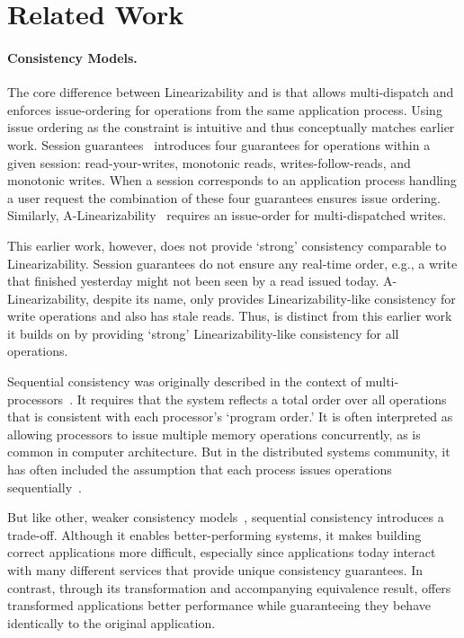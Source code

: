 \section{Related Work}
\label{sec:related}


\paragraph{Consistency Models.}
The core difference between Linearizability and \mdl{} is that \mdl{} allows multi-dispatch and enforces issue-ordering for operations from the same application process.
Using issue ordering as the constraint is intuitive and thus conceptually matches earlier work.
Session guarantees~\cite{terry1994session} introduces four guarantees for operations within a given session: read-your-writes, monotonic reads, writes-follow-reads, and monotonic writes. When a session corresponds to an application process handling a user request the combination of these four guarantees ensures issue ordering.
Similarly, A-Linearizability~\cite{hunt2010zookeeper} requires an issue-order for multi-dispatched writes.

This earlier work, however, does not provide `strong' consistency comparable to Linearizability.
Session guarantees do not ensure any real-time order, e.g., a write that finished yesterday might not been seen by a read issued today.
A-Linearizability, despite its name, only provides Linearizability-like consistency for write operations and also has stale reads.
Thus, \Mdl{} is distinct from this earlier work it builds on by providing `strong' Linearizability-like consistency for all operations.

Sequential consistency was originally described in the context of
multi-processors~\cite{lamport1979sequential}. It requires that
the system reflects a total order over all operations that is 
consistent with each processor's `program order.' It is often
interpreted as allowing processors to issue multiple memory 
operations concurrently, as is common in computer architecture.
But in the distributed systems community, it has often
included the assumption that each process issues operations 
sequentially~\cite{attiya1993seqlin}.

But like other, weaker consistency
models~\cite{ahamad1995causal,lloyd2011cops,terry1995bayou,deCandia2007dynamo, antipode}, 
sequential consistency introduces a trade-off. Although it enables
better-performing systems, it makes building correct applications more difficult, especially since applications today interact with many different services that provide unique consistency guarantees. In contrast, through its transformation
and accompanying equivalence result, \MDL{} offers transformed
applications better performance while guaranteeing they behave 
identically to the original application.

